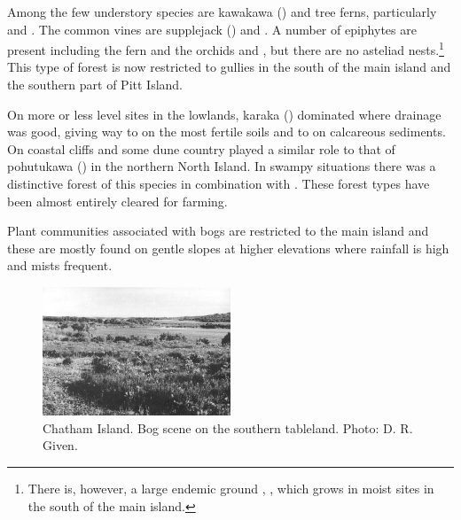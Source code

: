 Among the few understory species are kawakawa () and tree ferns, particularly  and .
The common vines are supplejack () and .
A number of epiphytes are present including the fern  and the orchids  and , but there are no asteliad nests.\footnote{There is, however, a large endemic ground , , which grows in moist sites in the south of the main island.}
This type of forest is now restricted to gullies in the south of the main island and the southern part of Pitt Island.

On more or less level sites in the lowlands, karaka () dominated where drainage was good, giving way to  on the most fertile soils and to  on calcareous sediments.
On coastal cliffs and some dune country  played a similar role to that of pohutukawa () in the northern North Island.
In swampy situations there was a distinctive forest of this species in combination with .
These forest types have been almost entirely cleared for farming.

Plant communities associated with bogs are restricted to the main island and these are mostly found on gentle slopes at higher elevations where rainfall is high and mists frequent.

\begin{figure}
	\includegraphics[width=0.5\textwidth]{graphics/figure119chatham-island-bog.jpg}
	\centering
	\caption[Chatham Island bog scene]{Chatham Island.
	Bog scene on the southern tableland.
	Photo: D. R. Given.}%
	\label{fig:119chatham-island-bog}
\end{figure}

